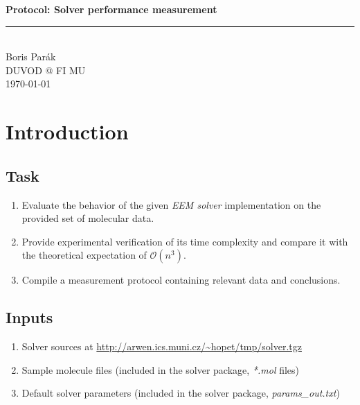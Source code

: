\documentclass[a4paper,12pt]{article}
\makeatletter
\newcommand{\protocol}{Solver performance measurement}
\newcommand{\labtitle}{DUVOD @ FI MU}
\newcommand{\authorname}{Boris Parák}
\makeatother
\begin{document}
\begin{titlepage}
\begin{center}
{\LARGE \textbf{Protocol: \protocol} \\ \vspace{4pt}}
\rule[13pt]{\textwidth}{1pt} \\ \vspace{150pt}
{\large \authorname \\ \vspace{10pt}
{\large \textsc{\labtitle} \\ \vspace{10pt}}
\today}
\end{center}
\end{titlepage}

\newpage
\thispagestyle{empty}
\tableofcontents
\clearpage

\setcounter{page}{1}

\section{Introduction}

\subsection{Task}
\label{subsec:task}
\begin{enumerate}
    \item Evaluate the behavior of the given \textit{EEM solver} implementation
          on the provided set of molecular data.
    \item Provide experimental verification of its time complexity and compare it
          with the theoretical expectation of $\mathcal{O}(n^3)$.
    \item Compile a measurement protocol containing relevant data and conclusions.
\end{enumerate}

\subsection{Inputs}
\label{sebsec:inputs}
\begin{enumerate}
    \item Solver sources at \url{http://arwen.ics.muni.cz/\~hopet/tmp/solver.tgz}
    \item Sample molecule files (included in the solver package, \textit{*.mol} files)
    \item Default solver parameters (included in the solver package, \textit{params\_out.txt})
\end{enumerate}
\end{document}
